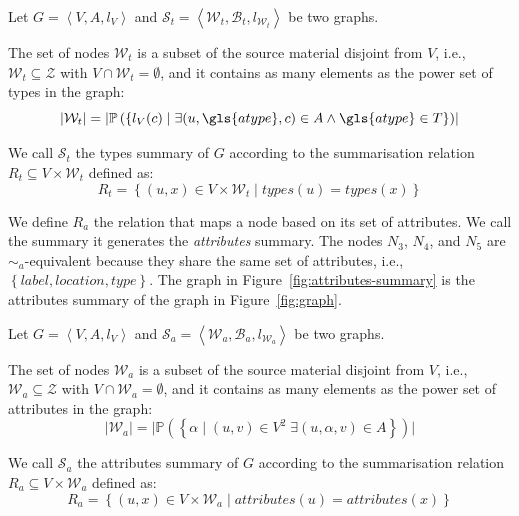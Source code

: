 \begin{definition}
	Let $G=\left\langle V, A, l_V \right\rangle$ and $\mathcal{S}_t = \left\langle \mathcal{W}_t, \mathcal{B}_t, l_{\mathcal{W}_t} \right\rangle$ be two graphs.

	The set of nodes $\mathcal{W}_t$ is a subset of the source material disjoint from $V$, i.e., $\mathcal{W}_t \subseteq \mathcal{Z}$ with $V \cap \mathcal{W}_t = \emptyset$, and it contains as many elements as the power set of types in the graph:
	$$
	\lvert \mathcal{W}_t \rvert = \lvert \mathbb{P}\left( \left\lbrace l_V(c) \mid \exists (u, \gls{atype}, c) \in A \wedge \gls{atype} \in T \right\rbrace \right) \rvert
	$$

	We call $\mathcal{S}_t$ the types summary of $G$ according to the summarisation relation $R_t \subseteq V \times \mathcal{W}_t$ defined as:
	$$
	R_t = \left\lbrace (u, x) \in V \times \mathcal{W}_t \mid types(u) = types(x) \right\rbrace
	$$
	\label{def:t}
\end{definition}
\vspace{.5cm}


We define $R_a$ the relation that maps a node based on its set of attributes. We call the summary it generates the \emph{attributes} summary.
The nodes $N_3$, $N_4$, and $N_5$ are $\sim_a$-equivalent because they share the same set of attributes, i.e., $\left\lbrace label, location, type \right\rbrace$. The graph in Figure~\ref{fig:attributes-summary} is the attributes summary of the graph in Figure~\ref{fig:graph}.

\begin{definition}
	Let $G=\left\langle V, A, l_V \right\rangle$ and $\mathcal{S}_a = \left\langle \mathcal{W}_a, \mathcal{B}_a, l_{\mathcal{W}_a} \right\rangle$ be two graphs.

	The set of nodes $\mathcal{W}_a$ is a subset of the source material disjoint from $V$, i.e., $\mathcal{W}_a \subseteq \mathcal{Z}$ with $V \cap \mathcal{W}_a = \emptyset$, and it contains as many elements as the power set of attributes in the graph:
	$$
	\lvert \mathcal{W}_a \rvert = \lvert \mathbb{P}\left( \left\lbrace \alpha \mid (u, v) \in V^2\; \exists (u, \alpha, v) \in A \right\rbrace \right) \rvert
	$$

	We call $\mathcal{S}_a$ the attributes summary of $G$ according to the summarisation relation $R_a \subseteq V \times \mathcal{W}_a$ defined as:
	$$
	R_a = \left\lbrace (u, x) \in V \times \mathcal{W}_a \mid attributes(u) = attributes(x) \right\rbrace
	$$
	\label{def:a}
\end{definition}

